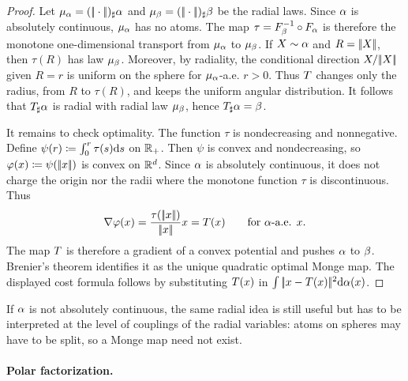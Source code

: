\begin{proof}
	Let $\mu_\alpha=(|\!| \cdot |\!|)_\sharp\alpha$ and $\mu_\beta=(|\!| \cdot |\!|)_\sharp\beta$ be the radial laws. Since $\alpha$ is absolutely continuous, $\mu_\alpha$ has no atoms. The map $\tau=F_\beta^{-1}\circ F_\alpha$ is therefore the monotone one-dimensional transport from $\mu_\alpha$ to $\mu_\beta$. If $X\sim\alpha$ and $R=|\!| X |\!|$, then $\tau(R)$ has law $\mu_\beta$. Moreover, by radiality, the conditional direction $X/|\!| X |\!|$ given $R=r$ is uniform on the sphere for $\mu_\alpha$-a.e. $r>0$. Thus $T$ changes only the radius, from $R$ to $\tau(R)$, and keeps the uniform angular distribution. It follows that $T_\sharp\alpha$ is radial with radial law $\mu_\beta$, hence $T_\sharp\alpha=\beta$.

	It remains to check optimality. The function $\tau$ is nondecreasing and nonnegative. Define $\psi(r)\coloneqq\int_0^r\tau(s)\mathrm{d} s$ on $\mathbb{R}_+$. Then $\psi$ is convex and nondecreasing, so $\varphi(x)\coloneqq\psi(|\!| x |\!|)$ is convex on $\mathbb{R}^d$. Since $\alpha$ is absolutely continuous, it does not charge the origin nor the radii where the monotone function $\tau$ is discontinuous. Thus
	\[
		\nabla\varphi(x)=\frac{\tau(|\!| x |\!|)}{|\!| x |\!|}x
		=T(x)
		\qquad\text{for }\alpha\text{-a.e. }x.
	\]
	The map $T$ is therefore a gradient of a convex potential and pushes $\alpha$ to $\beta$. Brenier's theorem identifies it as the unique quadratic optimal Monge map. The displayed cost formula follows by substituting $T(x)$ in $\int|\!| x-T(x) |\!|^2\mathrm{d}\alpha(x)$.
\end{proof}

If $\alpha$ is not absolutely continuous, the same radial idea is still useful but has to be interpreted at the level of couplings of the radial variables: atoms on spheres may have to be split, so a Monge map need not exist.

\paragraph{Polar factorization.}

